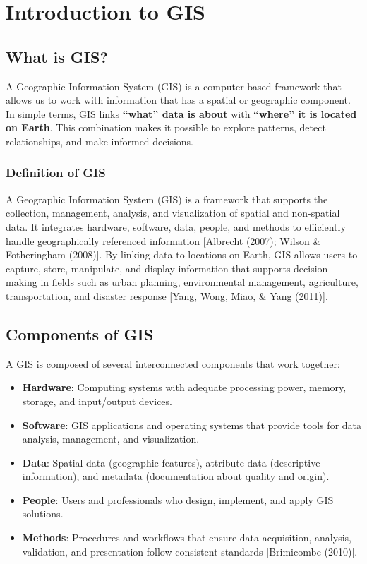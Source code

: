 \documentclass[
  11pt,
  letterpaper,
]{book}
\providecommand{\tightlist}{%
  \setlength{\itemsep}{0pt}\setlength{\parskip}{0pt}}
\begin{document}
\chapter{Introduction to GIS}\label{introduction-to-gis}

\section{What is GIS?}\label{what-is-gis}

A Geographic Information System (GIS) is a computer-based framework that
allows us to work with information that has a spatial or geographic
component. In simple terms, GIS links \textbf{``what'' data is about}
with \textbf{``where'' it is located on Earth}. This combination makes
it possible to explore patterns, detect relationships, and make informed
decisions.

\subsection{Definition of GIS}\label{definition-of-gis}

A Geographic Information System (GIS) is a framework that supports the
collection, management, analysis, and visualization of spatial and
non-spatial data. It integrates hardware, software, data, people, and
methods to efficiently handle geographically referenced information
{[}Albrecht (2007); Wilson \& Fotheringham (2008){]}. By linking data to
locations on Earth, GIS allows users to capture, store, manipulate, and
display information that supports decision-making in fields such as
urban planning, environmental management, agriculture, transportation,
and disaster response {[}Yang, Wong, Miao, \& Yang (2011){]}.

\section{Components of GIS}\label{components-of-gis}

A GIS is composed of several interconnected components that work
together:

\begin{itemize}
\tightlist
\item
  \textbf{Hardware}: Computing systems with adequate processing power,
  memory, storage, and input/output devices.
\item
  \textbf{Software}: GIS applications and operating systems that provide
  tools for data analysis, management, and visualization.
\item
  \textbf{Data}: Spatial data (geographic features), attribute data
  (descriptive information), and metadata (documentation about quality
  and origin).
\item
  \textbf{People}: Users and professionals who design, implement, and
  apply GIS solutions.
\item
  \textbf{Methods}: Procedures and workflows that ensure data
  acquisition, analysis, validation, and presentation follow consistent
  standards {[}Brimicombe (2010){]}.
\end{itemize}
\end{document}
